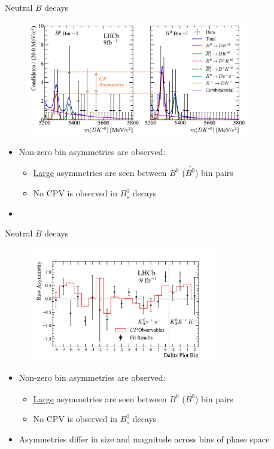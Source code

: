 \documentclass{beamer}
\begin{document}
\begin{frame}{Neutral $B$ decays}
  \begin{figure}
    \includegraphics[height = 5.0cm]{Plots/CPFitAsymmetry_B0toDKst.pdf}
  \end{figure}
  \begin{itemize}
    \setlength\itemsep{0.5em}
    \item{Non-zero bin asymmetries are observed:}
    \begin{itemize}
      \item{\underline{Large} asymmetries are seen between $B^0$ ($\bar{B^0}$) bin pairs}
      \item{No CPV is observed in $B^0_s$ decays}
    \end{itemize}
    \item[]{\phantom{Asymmetries differ in size and magnitude across bins of phase space}}
  \end{itemize}
\end{frame}

\begin{frame}{Neutral $B$ decays}
  \begin{figure}
    \includegraphics[height = 5.0cm]{Plots/Asymmetry_B0toDKst.pdf}
  \end{figure}
  \begin{itemize}
    \setlength\itemsep{0.5em}
    \item{Non-zero bin asymmetries are observed:}
    \begin{itemize}
      \item{\underline{Large} asymmetries are seen between $B^0$ ($\bar{B^0}$) bin pairs}
      \item{No CPV is observed in $B^0_s$ decays}
    \end{itemize}
    \item{Asymmetries differ in size and magnitude across bins of phase space}
  \end{itemize}
\end{frame}
\end{document}
